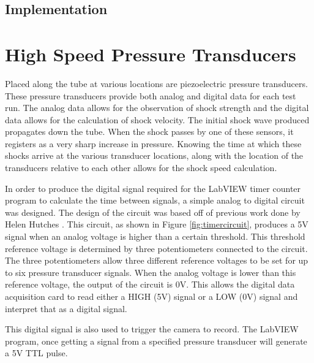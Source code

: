 \subsection{Implementation}





\section{High Speed Pressure Transducers}

Placed along the tube at various locations are piezoelectric pressure transducers. These pressure transducers provide both analog and digital data for each test run. The analog data allows for the observation of shock strength and the digital data allows for the calculation of shock velocity. The initial shock wave produced propagates down the tube. When the shock passes by one of these sensors, it registers as a very sharp increase in pressure. Knowing the time at which these shocks arrive at the various transducer locations, along with the location of the transducers relative to each other allows for the shock speed calculation. 

In order to produce the digital signal required for the LabVIEW timer counter program to calculate the time between signals, a simple analog to digital circuit was designed. The design of the circuit was based off of previous work done by Helen Hutches \cite{Hutchens2015}. This circuit, as shown in Figure \ref{fig:timercircuit}, produces a 5V signal when an analog voltage is higher than a certain threshold. This threshold reference voltage is determined by three potentiometers connected to the circuit. The three potentiometers allow three different reference voltages to be set for up to six pressure transducer signals. When the analog voltage is lower than this reference voltage, the output of the circuit is 0V. This allows the digital data acquisition card to read either a HIGH (5V) signal or a LOW (0V) signal and interpret that as a digital signal. 

This digital signal is also used to trigger the camera to record. The LabVIEW program, once getting a signal from a specified pressure transducer will generate a 5V TTL pulse. 

